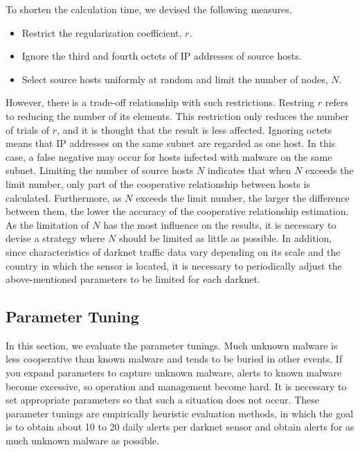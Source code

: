 \documentclass[letterpaper]{sig-alternate-10pt}
\begin{document}
To shorten the calculation time, we devised the following measures.
\begin{itemize}
	\item Restrict the regularization coefficient, $r$.
	\item Ignore the third and fourth octets of IP addresses of source hosts.
	\item Select source hosts uniformly at random and limit the number of nodes, $N$.
\end{itemize}

However, there is a trade-off relationship with such restrictions.
Restring $r$ refers to reducing the number of its elements.
This restriction only reduces the number of trials of $r$, and it is thought that the result is less affected.
Ignoring octets means that IP addresses on the same subnet are regarded as one host.
In this case, a false negative may occur for hosts infected with malware on the same subnet.
Limiting the number of source hosts $N$ indicates that when $N$ exceeds the limit number, only part of the cooperative relationship between hosts is calculated.
Furthermore, as $N$ exceeds the limit number, the larger the difference between them, the lower the accuracy of the cooperative relationship estimation.
As the limitation of $N$ has the most influence on the results, it is necessary to devise a strategy where $N$ should be limited as little as possible.
In addition, since characteristics of darknet traffic data vary depending on its scale and the country in which the sensor is located, it is necessary to periodically adjust the above-mentioned parameters to be limited for each darknet.


\subsection{Parameter Tuning}
In this section, we evaluate the parameter tunings.
Much unknown malware is less cooperative than known malware and tends to be buried in other events.
If you expand parameters to capture unknown malware, alerts to known malware become excessive, so operation and management become hard.
It is necessary to set appropriate parameters so that such a situation does not occur.
These parameter tunings are empirically heuristic evaluation methods, in which the goal is to obtain about 10 to 20 daily alerts per darknet sensor and obtain alerts for as much unknown malware as possible.
\end{document}
